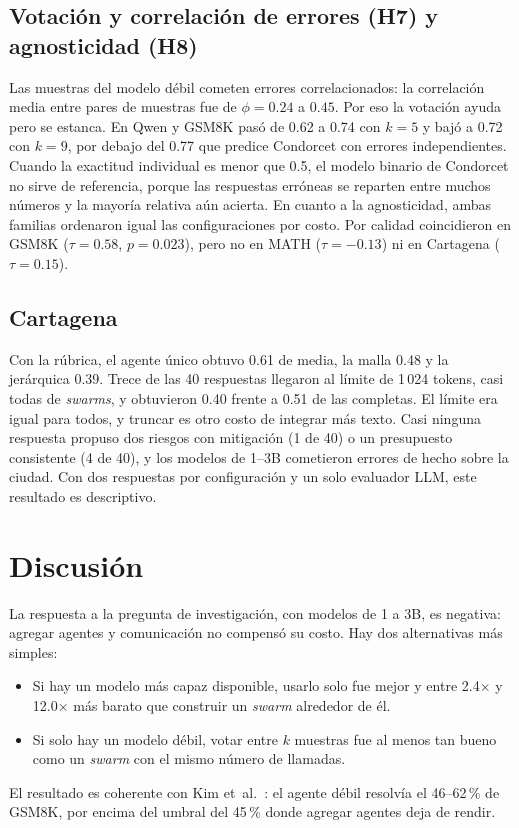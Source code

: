 \documentclass[conference]{IEEEtran}
\newcommand{\x}{\ensuremath{\times}}
\begin{document}
\subsection{Votación y correlación de errores (H7) y agnosticidad (H8)}

Las muestras del modelo débil cometen errores correlacionados: la correlación media entre pares de muestras fue de $\phi=0.24$ a $0.45$. Por eso la votación ayuda pero se estanca. En Qwen y GSM8K pasó de 0.62 a 0.74 con $k=5$ y bajó a 0.72 con $k=9$, por debajo del 0.77 que predice Condorcet con errores independientes. Cuando la exactitud individual es menor que 0.5, el modelo binario de Condorcet no sirve de referencia, porque las respuestas erróneas se reparten entre muchos números y la mayoría relativa aún acierta. En cuanto a la agnosticidad, ambas familias ordenaron igual las configuraciones por costo. Por calidad coincidieron en GSM8K ($\tau=0.58$, $p=0.023$), pero no en MATH ($\tau=-0.13$) ni en Cartagena ($\tau=0.15$).

\subsection{Cartagena}

Con la rúbrica, el agente único obtuvo 0.61 de media, la malla 0.48 y la jerárquica 0.39. Trece de las 40 respuestas llegaron al límite de 1\,024 tokens, casi todas de \textit{swarms}, y obtuvieron 0.40 frente a 0.51 de las completas. El límite era igual para todos, y truncar es otro costo de integrar más texto. Casi ninguna respuesta propuso dos riesgos con mitigación (1 de 40) o un presupuesto consistente (4 de 40), y los modelos de 1--3B cometieron errores de hecho sobre la ciudad. Con dos respuestas por configuración y un solo evaluador LLM, este resultado es descriptivo.

\section{Discusión}

La respuesta a la pregunta de investigación, con modelos de 1 a 3B, es negativa: agregar agentes y comunicación no compensó su costo. Hay dos alternativas más simples:
\begin{itemize}
\item Si hay un modelo más capaz disponible, usarlo solo fue mejor y entre 2.4\x{} y 12.0\x{} más barato que construir un \textit{swarm} alrededor de él.
\item Si solo hay un modelo débil, votar entre $k$ muestras fue al menos tan bueno como un \textit{swarm} con el mismo número de llamadas.
\end{itemize}
El resultado es coherente con Kim et~al.~\cite{kim2025scaling}: el agente débil resolvía el 46--62\,\% de GSM8K, por encima del umbral del 45\,\% donde agregar agentes deja de rendir.
\end{document}
